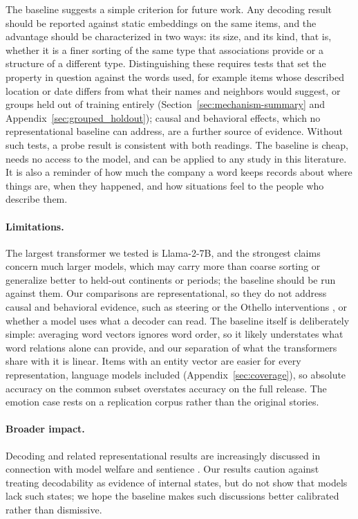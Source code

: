 \documentclass[11pt]{article}
\begin{document}
The baseline suggests a simple criterion for future work. Any decoding result should be reported against static embeddings on the same items, and the advantage should be characterized in two ways: its size, and its kind, that is, whether it is a finer sorting of the same type that associations provide or a structure of a different type. Distinguishing these requires tests that set the property in question against the words used, for example items whose described location or date differs from what their names and neighbors would suggest, or groups held out of training entirely (Section~\ref{sec:mechanism-summary} and Appendix~\ref{sec:grouped_holdout}); causal and behavioral effects, which no representational baseline can address, are a further source of evidence. Without such tests, a probe result is consistent with both readings. The baseline is cheap, needs no access to the model, and can be applied to any study in this literature. It is also a reminder of how much the company a word keeps \citep{firth1957synopsis} records about where things are, when they happened, and how situations feel to the people who describe them.

\paragraph{Limitations.}
The largest transformer we tested is Llama-2-7B, and the
strongest claims concern much larger models, which may carry more than coarse sorting or generalize
better to held-out continents or periods; the baseline should be run against them. Our comparisons are representational, so they do not
address causal and behavioral evidence, such as steering or the Othello interventions \citep{li2023emergent}, or whether a model uses what a
decoder can read. The baseline itself is deliberately simple: averaging word vectors
ignores word order, so it likely understates what word relations alone can provide, and our
separation of what the transformers share with it is linear. Items with an entity vector are easier for every representation, language models included (Appendix~\ref{sec:coverage}), so absolute accuracy on the common subset overstates accuracy on the full release. The emotion case rests on a
replication corpus rather than the original stories.

\paragraph{Broader impact.}
Decoding and related representational results are increasingly discussed in connection with model welfare and sentience \citep{keeling2024tradeoffs}. Our
results caution against treating decodability as evidence of internal states, but do not
show that models lack such states; we hope the baseline makes such discussions better calibrated rather than dismissive.
\end{document}
